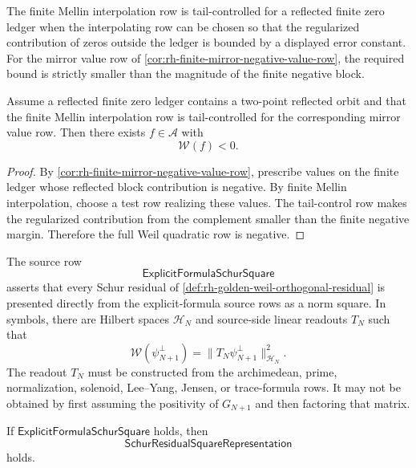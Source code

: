 \begin{definition}
\label{def:rh-tail-controlled-diagonal-interpolation}
The finite Mellin interpolation row is tail-controlled for a reflected
finite zero ledger when the interpolating row can be chosen so that the
regularized contribution of zeros outside the ledger is bounded by a
displayed error constant.  For the mirror value row of
\autoref{cor:rh-finite-mirror-negative-value-row}, the required bound is
strictly smaller than the magnitude of the finite negative block.
\end{definition}

\begin{theorem}
\label{thm:rh-tail-controlled-interpolation-negative-weil-probe}
Assume a reflected finite zero ledger contains a two-point reflected
orbit and that the finite Mellin interpolation row is tail-controlled
for the corresponding mirror value row.  Then there exists
$f\in\mathcal A$ with
$$
\mathcal W(f)<0.
$$
\end{theorem}

\begin{proof}
By \autoref{cor:rh-finite-mirror-negative-value-row}, prescribe values
on the finite ledger whose reflected block contribution is negative.
By finite Mellin interpolation, choose a test row realizing these
values.  The tail-control row makes the regularized contribution from
the complement smaller than the finite negative margin.  Therefore the
full Weil quadratic row is negative.
\end{proof}

\begin{definition}
\label{def:rh-explicit-formula-schur-square}
The source row
$$
\mathsf{ExplicitFormulaSchurSquare}
$$
asserts that every Schur residual of
\autoref{def:rh-golden-weil-orthogonal-residual} is presented directly
from the explicit-formula source rows as a norm square.  In symbols,
there are Hilbert spaces $\mathcal H_N$ and source-side linear readouts
$T_N$ such that
$$
\mathcal W(\psi_{N+1}^{\perp})
=
\|T_N\psi_{N+1}^{\perp}\|_{\mathcal H_N}^2.
$$
The readout $T_N$ must be constructed from the archimedean, prime,
normalization, solenoid, Lee--Yang, Jensen, or trace-formula rows.  It
may not be obtained by first assuming the positivity of $G_{N+1}$ and
then factoring that matrix.
\end{definition}

\begin{theorem}
\label{thm:rh-explicit-formula-schur-square-gives-square-representation}
If $\mathsf{ExplicitFormulaSchurSquare}$ holds, then
$$
\mathsf{SchurResidualSquareRepresentation}
$$
holds.
\end{theorem}

